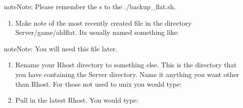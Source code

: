 \documentclass[letterpaper,10pt,english]{sphinxmanual}
\begin{document}
\begin{sphinxadmonition}{note}{Note:}
\sphinxAtStartPar
Please remember the \textquotesingle{}\sphinxhyphen{}s\textquotesingle{} to the ./backup\_flat.sh.
\end{sphinxadmonition}
\begin{enumerate}
%
\item {} 
\sphinxAtStartPar
Make note of the most recently created file in the directory Server/game/oldflat.  It\textquotesingle{}s usually named something like:

\begin{sphinxVerbatim}[commandchars=\\\{\}]
\end{sphinxVerbatim}

\end{enumerate}

\begin{sphinxadmonition}{note}{Note:}
\sphinxAtStartPar
You will need this file later.
\end{sphinxadmonition}
\begin{enumerate}
%
\item {} 
\sphinxAtStartPar
Rename your \textquotesingle{}Rhost\textquotesingle{} directory to something else.  This is the directory that you have containing the \textquotesingle{}Server\textquotesingle{} directory.  Name it anything you want other than \textquotesingle{}Rhost\textquotesingle{}.  For those not used to unix you would type:

\begin{sphinxVerbatim}[commandchars=\\\{\}]
  
\end{sphinxVerbatim}

\item {} 
\sphinxAtStartPar
Pull in the latest Rhost.  You would type:

\begin{sphinxVerbatim}[commandchars=\\\{\}]
   
\end{sphinxVerbatim}

\end{enumerate}
\end{document}
